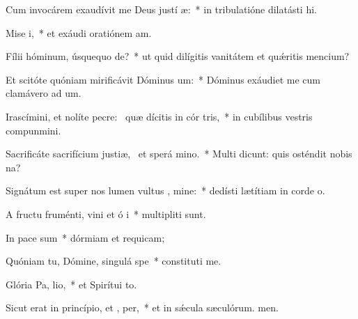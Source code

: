 \item Cum invocárem exaudívit me Deus justí æ:~* in tribulatióne dilatásti hi.
\item Mise i,~* et exáudi oratiónem am.
\item Fílii hóminum, úsquequo  de?~* ut quid dilígitis vanitátem et quǽritis mencium?
\item Et scitóte quóniam mirificávit Dóminus  um:~* Dóminus exáudiet me cum clamávero ad um.
\item Irascímini, et nolíte pecre:~\pscross{} quæ dícitis in cór tris,~* in cubílibus vestris compunmini.
\item Sacrificáte sacrifícium justiæ,~\pscross{} et sperá  mino.~* Multi dicunt: quis osténdit nobis na?
\item Signátum est super nos lumen vultus , mine:~* dedísti lætítiam in corde o.
\item A fructu fruménti, vini et ó i~* multipliti sunt.
\item In pace  sum~* dórmiam et requicam;
\item Quóniam tu, Dómine, singulá  spe~* constituti me.
\item Glória Pa,  lio,~* et Spirítui to.
\item Sicut erat in princípio, et ,  per,~* et in sǽcula sæculórum. men.
